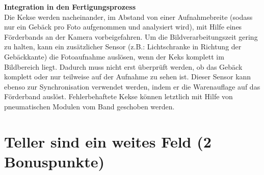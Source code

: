 \documentclass{ezb}
\begin{document}
\newline
\textbf{{\large Integration in den Fertigungsprozess}}\\
\newline
Die Kekse werden nacheinander, im Abstand von einer Aufnahmebreite (sodass nur ein Gebäck pro Foto aufgenommen und analysiert wird), mit Hilfe eines Förderbands an der Kamera vorbeigefahren. Um die Bildverarbeitungszeit gering zu halten, kann ein zusätzlicher Sensor (z.B.: Lichtschranke in Richtung der Gebäckkante) die Fotoaufnahme auslösen, wenn der Keks komplett im Bildbereich liegt. Dadurch muss nicht erst überprüft werden, ob das Gebäck komplett oder nur teilweise auf der Aufnahme zu sehen ist. Dieser Sensor kann ebenso zur Synchronisation verwendet werden, indem er die Warenauflage auf das Förderband auslöst. Fehlerbehaftete Kekse können letztlich mit Hilfe von pneumatischen Modulen vom Band geschoben werden.
\newpage
\section{Teller sind ein weites Feld (2 Bonuspunkte)}




\end{document}
